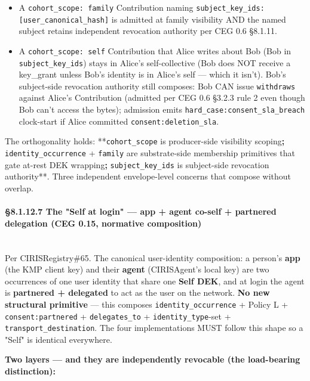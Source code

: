 \documentclass[10pt]{article}
\begin{document}
\begin{itemize}\setlength\itemsep{0pt}
\item A \texttt{cohort\_scope: family} Contribution naming \texttt{subject\_key\_ids: [user\_canonical\_hash]} is admitted at family visibility AND the named subject retains independent revocation authority per CEG 0.6 §8.1.11.
\item A \texttt{cohort\_scope: self} Contribution that Alice writes about Bob (Bob in \texttt{subject\_key\_ids}) stays in Alice's self-collective (Bob does NOT receive a key\_grant unless Bob's identity is in Alice's self — which it isn't). Bob's subject-side revocation authority still composes: Bob CAN issue \texttt{withdraws} against Alice's Contribution (admitted per CEG 0.6 §3.2.3 rule 2 even though Bob can't access the bytes); admission emits \texttt{hard\_case:consent\_sla\_breach} clock-start if Alice committed \texttt{consent:deletion\_sla}.
\end{itemize}


The orthogonality holds: **\texttt{cohort\_scope} is producer-side visibility scoping\textbf{; }\texttt{identity\_occurrence} + \texttt{family} are substrate-side membership primitives that gate at-rest DEK wrapping\textbf{; }\texttt{subject\_key\_ids} is subject-side revocation authority**. Three independent envelope-level concerns that compose without overlap.


\paragraph{§8.1.12.7 The "Self at login" — app + agent co-self + partnered delegation (CEG 0.15, normative composition)}\mbox{}\\


Per CIRISRegistry\#65. The canonical user-identity composition: a person's \textbf{app} (the KMP client key) and their \textbf{agent} (CIRISAgent's local key) are two occurrences of one user identity that share one \textbf{Self DEK}, and at login the agent is \textbf{partnered + delegated} to act as the user on the network. \textbf{No new structural primitive} — this composes \texttt{identity\_occurrence} + Policy L + \texttt{consent:partnered} + \texttt{delegates\_to} + \texttt{identity\_type}-set + \texttt{transport\_destination}. The four implementations MUST follow this shape so a "Self" is identical everywhere.



\textbf{Two layers — and they are independently revocable (the load-bearing distinction):}
\end{document}
